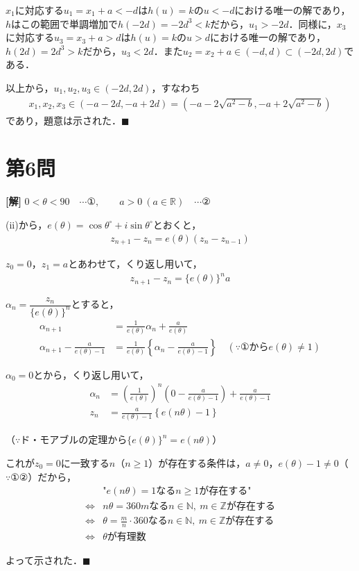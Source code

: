 \documentclass[../main.tex]{subfiles}
\begin{document}
$x_1$に対応する$u_1=x_1+a<-d$は$h(u)=k$の$u<-d$における唯一の解であり，$h$はこの範囲で単調増加で$h(-2d)=-2d^3<k$だから，$u_1>-2d$．同様に，$x_3$に対応する$u_3=x_3+a>d$は$h(u)=k$の$u>d$における唯一の解であり，$h(2d)=2d^3>k$だから，$u_3<2d$．また$u_2=x_2+a\in(-d,d)\subset(-2d,2d)$である．

以上から，$u_1,u_2,u_3\in(-2d,2d)$，すなわち
\begin{align*}
  x_1,x_2,x_3\in(-a-2d,-a+2d)=\left(-a-2\sqrt{a^2-b},-a+2\sqrt{a^2-b}\right)
\end{align*}
であり，題意は示された．$\blacksquare$

\newpage

\section*{第6問}

{\bf [解]}
$0<\theta<90\quad\cdots①,\qquad a>0\ (a\in\mathbb R)\quad\cdots②$

(ii)から，$e(\theta)=\cos\theta^\circ+i\sin\theta^\circ$とおくと，
\begin{align*}
  z_{n+1}-z_n=e(\theta)(z_n-z_{n-1})
\end{align*}

$z_0=0$，$z_1=a$とあわせて，くり返し用いて，
\begin{align*}
  z_{n+1}-z_n=\{e(\theta)\}^na
\end{align*}

$\alpha_n=\dfrac{z_n}{\{e(\theta)\}^n}$とすると，
\begin{align*}
  \alpha_{n+1}&=\frac1{e(\theta)}\alpha_n+\frac a{e(\theta)}\\
  \alpha_{n+1}-\frac a{e(\theta)-1}&=\frac1{e(\theta)}\left\{\alpha_n-\frac a{e(\theta)-1}\right\}\quad(\because①から e(\theta)\ne1)
\end{align*}

$\alpha_0=0$とから，くり返し用いて，
\begin{align*}
  \alpha_n&=\left(\frac1{e(\theta)}\right)^n\left(0-\frac a{e(\theta)-1}\right)+\frac a{e(\theta)-1}\\
  z_n&=\frac a{e(\theta)-1}\left\{e(n\theta)-1\right\}
\end{align*}

（$\because$ド・モアブルの定理から$\{e(\theta)\}^n=e(n\theta)$）

これが$z_0=0$に一致する$n$（$n\ge1$）が存在する条件は，$a\ne0$，$e(\theta)-1\ne0$（$\because①②$）だから，
\begin{align*}
  &\text{"}e(n\theta)=1\text{なる}n\ge1\text{が存在する"}\\
  \iff&n\theta=360m\text{なる}n\in\mathbb N,\ m\in\mathbb Z\text{が存在する}\\
  \iff&\theta=\frac mn\cdot360\text{なる}n\in\mathbb N,\ m\in\mathbb Z\text{が存在する}\\
  \iff&\theta\text{が有理数}
\end{align*}

よって示された．$\blacksquare$

\newpage
\end{document}

